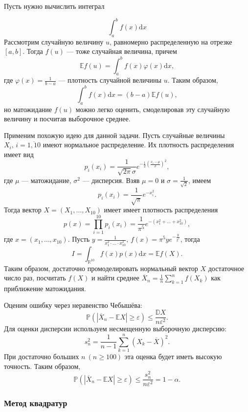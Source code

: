 \documentclass{article}
\renewcommand{\le}{\leqslant}
\renewcommand{\ge}{\geqslant}
\theoremstyle{definition}
\begin{document}
Пусть нужно вычислить интеграл

$$
    \int_a^b f(x) \mathrm{d}x
$$
Рассмотрим случайную величину $u$, равномерно распределенную на отрезке $[a, b]$. Тогда $f(u)$ --- тоже случайная величина, причем
$$
    \mathbb{E}f(u) = \int_a^b f(x) \varphi(x) \mathrm{d}x,
$$
где $\varphi(x) = \frac{1}{b-a}$ --- плотность случайной величины $u$. Таким образом,
$$
    \int_a^b f(x) \mathrm{d}x = (b - a) \mathbb{E}f(u),
$$
но матожидание $f(u)$ можно легко оценить, смоделировав эту случайную величину и посчитав выборочное среднее.

Применим похожую идею для данной задачи. Пусть случайные величины $X_i,\, i = \overline{1, 10}$ имеют нормальное распределение. Их плотность распределения имеет вид
$$
    p_i(x_i) = \frac{1}{\sqrt{2\pi}\sigma}e^{-\frac{1}{2}\left(\frac{x_i - \mu}{\sigma}\right)^2},
$$
где $\mu$ --- матожидание, $\sigma^2$ --- дисперсия. Взяв $\mu = 0$ и $\sigma = \frac{1}{\sqrt 2}$, имеем
$$
    p_i(x_i) = \frac{1}{\sqrt \pi}e^{-x_i^2}.
$$
Тогда вектор $X = (X_1, \dots, X_{10})$ имеет имеет плотность распределения
$$
    p(x) = \prod_{i = 1}^{10} p_i(x_i) = \frac{1}{\pi^5}e^{-(x_1^2 + \dots + x_{10}^2)},
$$
где $x = (x_1, \dots, x_{10})$. Пусть $y = \frac{1}{x_1^2 \cdot \dots \cdot x_{10}^2},\,f(x) = \pi^5 ye^{-\frac{y}{2^7}}$, тогда
$$
    I = \int_{\mathbb{R}^{10}} f(x)p(x)\mathrm{d}x = \mathbb{E}f(X).
$$
Таким образом, достаточно промоделировать нормальный вектор $X$ достаточное число раз, посчитать $f(X)$ и найти среднее $\overline X_n = \frac{1}{n}\sum_{k = 1}^n f(X_k)$ как приближение матожидания.

Оценим ошибку через неравенство Чебышёва:
$$
    \mathbb{P}(|\overline X_n - \mathbb E X| \ge \varepsilon) \le \frac{\mathbb{D} X}{n \varepsilon^2}.
$$
Для оценки дисперсии используем несмещенную выборочную дисперсию:
$$
    s^2_n = \frac{1}{n-1}\sum_{k = 1}^n (X_k - \overline X)^2.
$$
При достаточно больших $n\ (n \ge 100)$ эта оценка будет иметь высокую точность.
Таким образом,
$$
    \mathbb{P}(|\overline X_n - \mathbb E X| \ge \varepsilon) \le \frac{s^2_n}{n \varepsilon^2} = 1 - \alpha.
$$

\subsubsection{Метод квадратур}
\end{document}
